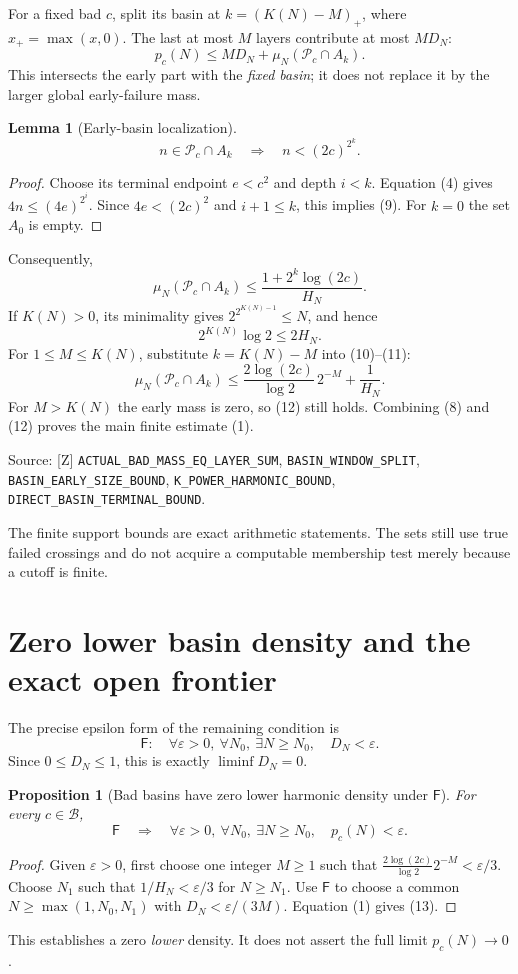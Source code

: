 \documentclass[11pt,a4paper]{article}
\newtheorem{proposition}[theorem]{Proposition}
\newtheorem{lemma}[theorem]{Lemma}
\theoremstyle{definition}
\newcommand{\FF}{\mathsf F}
\newcommand{\Bad}{\mathcal B}
\newcommand{\Pred}{\mathcal P}
\newcommand{\source}[1]{\par{\footnotesize\color{ink}Source: #1.}\par}
\begin{document}
For a fixed bad $c$, split its basin at $k=(K(N)-M)_+$, where
$x_+=\max(x,0)$. The last at most $M$ layers contribute at most $M D_N$:
\[
 p_c(N)\le M D_N+\mu_N(\Pred_c\cap A_k).
 \tag{8}
\]
This intersects the early part with the \emph{fixed basin}; it does not
replace it by the larger global early-failure mass.

\begin{lemma}[Early-basin localization]
\[
 n\in\Pred_c\cap A_k\quad\Longrightarrow\quad n<(2c)^{2^k}.
 \tag{9}
\]
\end{lemma}
\begin{proof}
Choose its terminal endpoint $e<c^2$ and depth $i<k$.
Equation (4) gives $4n\le(4e)^{2^i}$.
Since $4e<(2c)^2$ and $i+1\le k$, this implies (9).
For $k=0$ the set $A_0$ is empty.
\end{proof}
Consequently,
\[
 \mu_N(\Pred_c\cap A_k)
 \le\frac{1+2^k\log(2c)}{H_N}.
 \tag{10}
\]
If $K(N)>0$, its minimality gives
$2^{2^{K(N)-1}}\le N$, and hence
\[
 2^{K(N)}\log2\le2H_N.
 \tag{11}
\]
For $1\le M\le K(N)$, substitute $k=K(N)-M$ into (10)--(11):
\[
 \mu_N(\Pred_c\cap A_k)
 \le\frac{2\log(2c)}{\log2}\,2^{-M}+\frac1{H_N}.
 \tag{12}
\]
For $M>K(N)$ the early mass is zero, so (12) still holds.
Combining (8) and (12) proves the main finite estimate (1).

\source{[Z] \nolinkurl{ACTUAL_BAD_MASS_EQ_LAYER_SUM},
\nolinkurl{BASIN_WINDOW_SPLIT}, \nolinkurl{BASIN_EARLY_SIZE_BOUND},
\nolinkurl{K_POWER_HARMONIC_BOUND},
\nolinkurl{DIRECT_BASIN_TERMINAL_BOUND}}
The finite support bounds are exact arithmetic statements. The sets still
use true failed crossings and do not acquire a computable membership test
merely because a cutoff is finite.

\newpage
\section{Zero lower basin density and the exact open frontier}
The precise epsilon form of the remaining condition is
\[
 \FF:\quad
 \forall\varepsilon>0,\ \forall N_0,\ \exists N\ge N_0,\quad D_N<\varepsilon.
 \tag{F}
\]
Since $0\le D_N\le1$, this is exactly $\liminf D_N=0$.

\begin{proposition}[Bad basins have zero lower harmonic density under $\FF$]
For every $c\in\Bad$,
\[
 \FF\quad\Longrightarrow\quad
 \forall\varepsilon>0,\ \forall N_0,\ \exists N\ge N_0,\quad
 p_c(N)<\varepsilon.
 \tag{13}
\]
\end{proposition}
\begin{proof}
Given $\varepsilon>0$, first choose one integer $M\ge1$ such that
$\frac{2\log(2c)}{\log2}2^{-M}<\varepsilon/3$.
Choose $N_1$ such that $1/H_N<\varepsilon/3$ for $N\ge N_1$.
Use $\FF$ to choose a common
$N\ge\max(1,N_0,N_1)$ with $D_N<\varepsilon/(3M)$.
Equation (1) gives (13).
\end{proof}
This establishes a zero \emph{lower} density. It does not assert the
full limit $p_c(N)\to0$.
\end{document}
